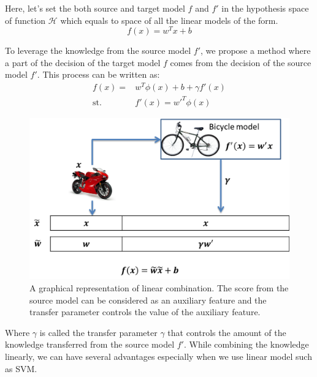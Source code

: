 Here, let's set the both source and target model $f$ and $f'$ in the hypothesis space of function $\mathcal{H}$ which equals to space of all the linear models of the form. 
\begin{equation}
f(x)=w^Tx+b
\end{equation}

To leverage the knowledge from the source model $f'$, we propose a method where a part of the decision of the target model $f$ comes from the decision of the source model $f'$. This process can be written as:
\begin{equation}\label{eq:single:linear}
\begin{aligned}
 f(x) = & w^T\phi(x)+b+\gamma f'(x) \\
\text{st.} \qquad & f'(x) = w'^T\phi(x)
\end{aligned}
\end{equation}

\begin{figure}
	\centering
	\includegraphics[scale=.7]{transfer/fig/argumentation.png}
	\caption{A graphical representation of linear combination. The score from the source model can be considered as an auxiliary feature and the transfer parameter controls the value of the auxiliary feature.}\label{fig:single:arg}
\end{figure}
Where $\gamma$ is called the transfer parameter $\gamma$ that controls the amount of the knowledge transferred from the source model $f'$. 
While combining the knowledge linearly, we can have several advantages especially when we use linear model such as SVM.

